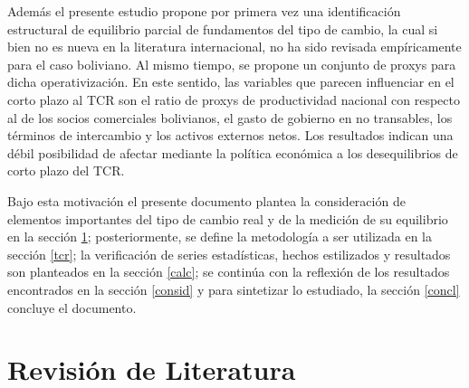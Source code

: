 \documentclass[12pt,letterpaper]{article}
\begin{document}
Además el presente estudio propone por primera vez una identificación estructural de equilibrio parcial de fundamentos del tipo de cambio, la cual si bien no es nueva en la literatura internacional, no ha sido revisada empíricamente para el caso boliviano. Al mismo tiempo, se propone un conjunto de proxys para dicha operativización. En este sentido, las variables que parecen influenciar en el corto plazo al TCR son el ratio de proxys de productividad nacional con respecto al de los socios comerciales bolivianos, el gasto de gobierno en no transables, los términos de intercambio y los activos externos netos. Los resultados indican una débil posibilidad de afectar mediante la política económica a los desequilibrios de corto plazo del TCR.

Bajo esta motivación el presente documento plantea la consideración de elementos importantes del tipo de cambio real y de la medición de su equilibrio en la sección \ref{pre}; posteriormente, se define la metodología a ser utilizada en la sección \ref{tcr}; la verificación de series estadísticas, hechos estilizados y resultados son planteados en la sección \ref{calc}; se continúa con la reflexión de los resultados encontrados en la sección \ref{consid} y para sintetizar lo estudiado, la sección \ref{concl} concluye el documento.

\section{Revisión de Literatura}\label{pre}
\end{document}
